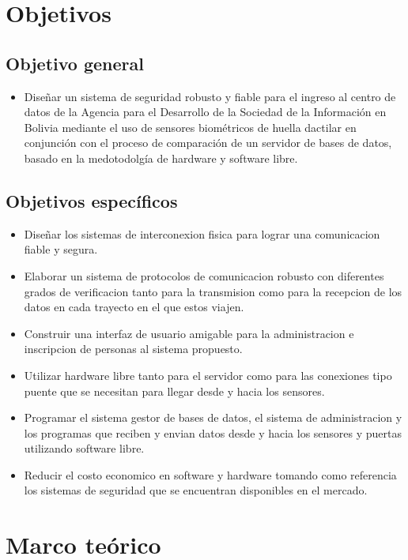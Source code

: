 \documentclass[12pt, letterpaper]{scrartcl}
\begin{document}
	\section{Objetivos}
	\subsection{Objetivo general}
	\begin{itemize}
		\item Diseñar un sistema de seguridad robusto y fiable para el ingreso al centro de datos de la Agencia para el Desarrollo de la Sociedad de la Información en Bolivia mediante el uso de sensores biométricos de huella dactilar en conjunción con el proceso de comparación de un servidor de bases de datos, basado en la medotodolgía de hardware y software libre.
	\end{itemize}
	\subsection{Objetivos específicos}
	\begin{itemize}
		\item Diseñar los sistemas de interconexion fisica para lograr una comunicacion fiable y segura.
		\item Elaborar un sistema de protocolos de comunicacion robusto con diferentes grados de verificacion tanto para la transmision como para la recepcion de los datos en cada trayecto en el que estos viajen.
		\item Construir una interfaz de usuario amigable para la administracion e inscripcion de personas al sistema propuesto.
		\item Utilizar hardware libre tanto para el servidor como para las conexiones tipo puente que se necesitan para llegar desde y hacia los sensores.
		\item Programar el sistema gestor de bases de datos, el sistema de administracion y los programas que reciben y envian datos desde y hacia los sensores y puertas utilizando software libre.
		\item Reducir el costo economico en software y hardware tomando como referencia los sistemas de seguridad que se encuentran disponibles en el mercado.
	\end{itemize}
	
	\section{Marco teórico}
	
\end{document}
